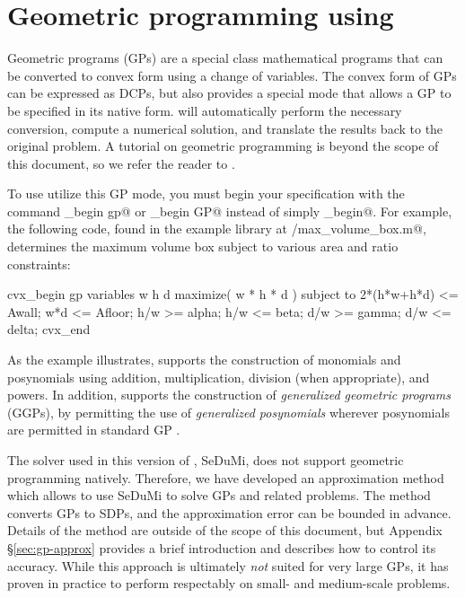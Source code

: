 \documentclass[12pt]{article}
\begin{document}
\section{Geometric programming using \cvx}
\label{sec:gpmode}

Geometric programs (GPs) are a special class mathematical programs 
that can be converted to convex form using a change of variables.
The convex form of GPs can be expressed as DCPs, but \cvx also 
provides a special mode that allows a GP to be specified in 
its native form. \cvx will automatically perform the necessary
conversion, compute a numerical solution, and translate the results
back to the original problem.
A tutorial on geometric programming is beyond the scope of this document, so we
refer the reader to \cite{BKVH:05}.

To use utilize this GP mode, you must begin your \cvx specification
with the command \verb@cvx_begin gp@ or \verb@cvx_begin GP@ instead of simply
\verb@cvx_begin@. For example,
the following code, found in the example library at \verb@gp/max_volume_box.m@,
determines the maximum volume box subject to
various area and ratio constraints:
\begin{code}
	cvx_begin gp
	    variables w h d
	    maximize( w * h * d )
	    subject to
	        2*(h*w+h*d) <= Awall;
	        w*d <= Afloor;
	        h/w >= alpha;
	        h/w <= beta;
	        d/w >= gamma;
	        d/w <= delta;
	cvx_end
\end{code}
As the example illustrates, \cvx supports the construction of monomials and
posynomials using addition, multiplication, division (when appropriate),
and powers. In addition, \cvx supports the construction of \emph{generalized
geometric programs} (GGPs), by permitting the use of \emph{generalized
posynomials} wherever posynomials are permitted in standard GP \cite{BKVH:05}.

The solver used in this version of \cvx, SeDuMi, does
not support geometric programming natively. Therefore, we have developed an
approximation method which allows \cvx to use SeDuMi to solve GPs and related
problems. The method converts GPs to SDPs, and the approximation error can be bounded in advance.
Details of the method are outside of the scope of this document,
but Appendix \S\ref{sec:gp-approx} provides a brief introduction  and describes
how to control its accuracy. While this approach
is ultimately \emph{not} suited for very large GPs, it has proven
in practice to perform respectably on small- and medium-scale
problems.
\end{document}
